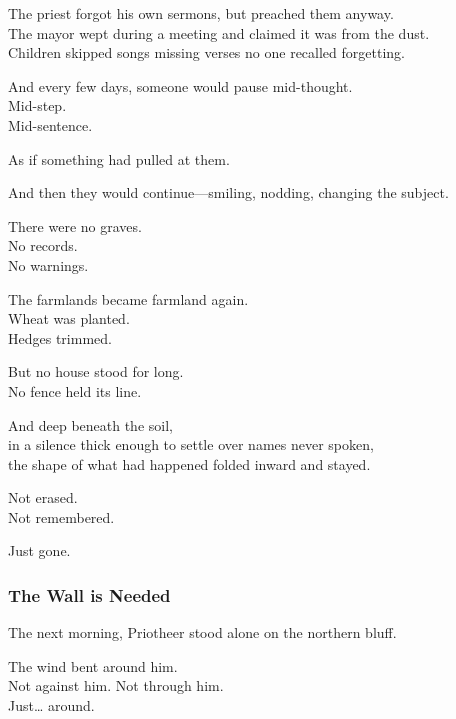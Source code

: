 \documentclass[12pt]{article}
\begin{document}
\vspace{0.5em}
The priest forgot his own sermons, but preached them anyway.\\
The mayor wept during a meeting and claimed it was from the dust.\\
Children skipped songs missing verses no one recalled forgetting.

\vspace{0.5em}
And every few days, someone would pause mid-thought.\\
Mid-step.\\
Mid-sentence.

\vspace{0.5em}
As if something had pulled at them.

\vspace{0.5em}
And then they would continue---smiling, nodding, changing the subject.

\vspace{0.5em}
There were no graves.\\
No records.\\
No warnings.

\vspace{0.5em}
The farmlands became farmland again.\\
Wheat was planted.\\
Hedges trimmed.

\vspace{0.5em}
But no house stood for long.\\
No fence held its line.

\vspace{0.5em}
And deep beneath the soil,\\
in a silence thick enough to settle over names never spoken,\\
the shape of what had happened folded inward and stayed.

\vspace{0.5em}
Not erased.\\
Not remembered.

\vspace{0.5em}
Just gone.

\dotfill

\subsubsection*{The Wall is Needed}

The next morning, Priotheer stood alone on the northern bluff.

\vspace{0.5em}
The wind bent around him.\\
Not against him. Not through him.\\
Just\ldots{} around.
\end{document}
